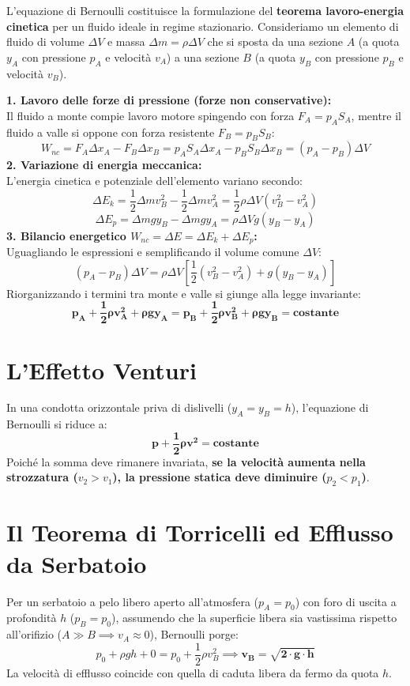 \documentclass[11pt,a4paper,oneside]{report}
\begin{document}
L'equazione di Bernoulli costituisce la formulazione del \textbf{teorema lavoro-energia cinetica} per un fluido ideale in regime stazionario.
Consideriamo un elemento di fluido di volume $\Delta V$ e massa $\Delta m = \rho \Delta V$ che si sposta da una sezione $A$ (a quota $y_A$ con pressione $p_A$ e velocit\`a $v_A$) a una sezione $B$ (a quota $y_B$ con pressione $p_B$ e velocit\`a $v_B$).

\textbf{1. Lavoro delle forze di pressione (forze non conservative):}\\
Il fluido a monte compie lavoro motore spingendo con forza $F_A = p_A S_A$, mentre il fluido a valle si oppone con forza resistente $F_B = p_B S_B$:
\[
W_{nc} = F_A \Delta x_A - F_B \Delta x_B = p_A S_A \Delta x_A - p_B S_B \Delta x_B = (p_A - p_B) \Delta V
\]
\textbf{2. Variazione di energia meccanica:}\\
L'energia cinetica e potenziale dell'elemento variano secondo:
\[
\Delta E_k = \frac{1}{2}\Delta m v_B^2 - \frac{1}{2}\Delta m v_A^2 = \frac{1}{2}\rho \Delta V (v_B^2 - v_A^2)
\]
\[
\Delta E_p = \Delta m g y_B - \Delta m g y_A = \rho \Delta V g (y_B - y_A)
\]
\textbf{3. Bilancio energetico $W_{nc} = \Delta E = \Delta E_k + \Delta E_p$:}\\
Uguagliando le espressioni e semplificando il volume comune $\Delta V$:
\[
(p_A - p_B)\Delta V = \rho \Delta V \left[ \frac{1}{2}(v_B^2 - v_A^2) + g(y_B - y_A) \right]
\]
Riorganizzando i termini tra monte e valle si giunge alla legge invariante:
\[
\mathbf{p_A + \frac{1}{2}\rho v_A^2 + \rho g y_A = p_B + \frac{1}{2}\rho v_B^2 + \rho g y_B = \text{costante}}
\]

\section{L'Effetto Venturi}

In una condotta orizzontale priva di dislivelli ($y_A = y_B = h$), l'equazione di Bernoulli si riduce a:
\[
\mathbf{p + \frac{1}{2}\rho v^2 = \text{costante}}
\]
Poich\'e la somma deve rimanere invariata, \textbf{se la velocit\`a aumenta nella strozzatura ($v_2 > v_1$), la pressione statica deve diminuire ($p_2 < p_1$)}.

\section{Il Teorema di Torricelli ed Efflusso da Serbatoio}

Per un serbatoio a pelo libero aperto all'atmosfera ($p_A = p_0$) con foro di uscita a profondit\`a $h$ ($p_B = p_0$), assumendo che la superficie libera sia vastissima rispetto all'orifizio ($A \gg B \implies v_A \approx 0$), Bernoulli porge:
\[
p_0 + \rho g h + 0 = p_0 + \frac{1}{2}\rho v_B^2 \implies \mathbf{v_B = \sqrt{2 \cdot g \cdot h}}
\]
La velocit\`a di efflusso coincide con quella di caduta libera da fermo da quota $h$.
\end{document}
